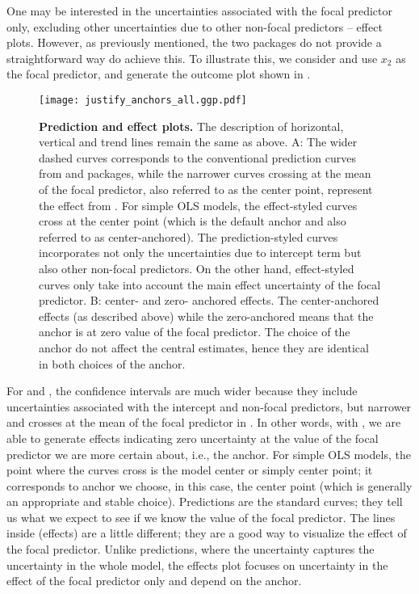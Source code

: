 One may be interested in the uncertainties associated with the focal predictor only, excluding other uncertainties due to other non-focal predictors -- effect plots. However, as previously mentioned, the two packages do not provide a straightforward way do achieve this. To illustrate this, we consider  and use $x_2$ as the focal predictor, and generate the outcome plot shown in . 
%
\begin{figure}
\begin{center}
\texttt{[image: justify\_anchors\_all.ggp.pdf]}
\end{center}
\caption{{\bf Prediction and effect plots.} The description of horizontal, vertical and trend lines remain the same as above. A: The wider dashed curves corresponds to the conventional prediction curves from  and  packages, while the narrower curves crossing at the mean of the focal predictor, also referred to as the center point, represent the effect from . For simple OLS models, the effect-styled curves cross at the center point (which is the default anchor and also referred to as center-anchored). The prediction-styled curves incorporates not only the uncertainties due to intercept term but also other non-focal predictors. On the other hand, effect-styled curves only take into account the main effect uncertainty of the focal predictor. B: center- and zero- anchored effects. The center-anchored effects (as described above) while the zero-anchored means that the anchor is at zero value of the focal predictor. The choice of the anchor do not affect the central estimates, hence they are identical in both choices of the anchor.}
\label{fig:justify_ci_plots}
\end{figure}
%
For  and , the confidence intervals are much wider because they include uncertainties associated with the intercept and non-focal predictors, but narrower and crosses at the mean of the focal predictor in . In other words, with , we are able to generate effects indicating zero uncertainty at the value of the focal predictor we are more certain about, i.e., the anchor. For simple OLS models, the point where the curves cross is the model center or simply center point; it corresponds to anchor we choose, in this case, the center point (which is generally an appropriate and stable choice). Predictions are the standard curves; they tell us what we expect to see if we know the value of the focal predictor. The lines inside (effects) are a little different; they are a good way to visualize the effect of the focal predictor. Unlike predictions, where the uncertainty captures the uncertainty in the whole model, the effects plot focuses on uncertainty in the effect of the focal predictor only and depend on the anchor.


